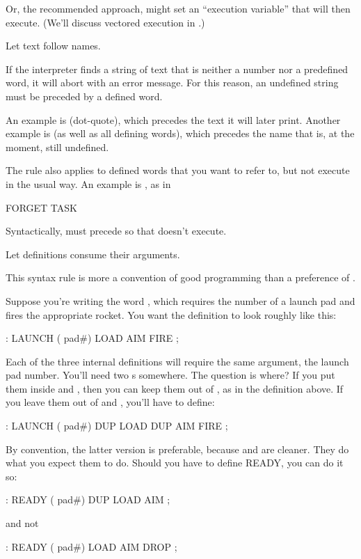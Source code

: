 Or, the recommended approach,  might set an ``execution
variable'' that  will then execute. (We'll discuss vectored
execution in .)

\begin{tip}
Let text follow names.
\end{tip}
If the \Forth{} interpreter finds a string of text that is neither a number
nor a predefined word, it will abort with an error message. For this
reason, an undefined string must be preceded by a defined word.

An example is  (dot-quote), which precedes the text it will later
print. Another example is  (as well as all defining words), which
precedes the name that is, at the moment, still undefined.

The rule also applies to defined words that you want to refer to, but
not execute in the usual way. An example is , as in

\begin{Code}
FORGET TASK
\end{Code}
Syntactically,  must precede  so that  doesn't
execute.

\begin{tip}
Let definitions consume their arguments.
\end{tip}
This syntax rule is more a convention of good \Forth{} programming
than a preference of \Forth{}.

Suppose you're writing the word , which requires the
number of a launch pad and fires the appropriate rocket. You want the
definition to look roughly like this:
\begin{Code}
: LAUNCH  ( pad#)  LOAD  AIM  FIRE ;
\end{Code}
Each of the three internal definitions will require the same argument, the
launch pad number. You'll need two s somewhere. The question is
where? If you put them inside  and , then you can keep them
out of , as in the definition above. If you leave them out of
 and , you'll have to define:
\begin{Code}
: LAUNCH  ( pad#)  DUP LOAD  DUP AIM  FIRE ;
\end{Code}
By convention, the latter version is preferable, because  and 
are cleaner. They do what you expect them to do. Should you have to
define READY, you can do it so:
\begin{Code}
: READY  ( pad#)  DUP LOAD  AIM ;
\end{Code}
and not
\begin{Code}
: READY  ( pad#)  LOAD  AIM  DROP ;
\end{Code}

